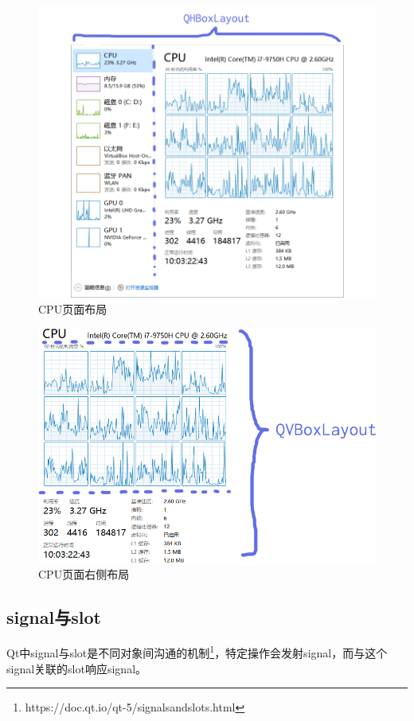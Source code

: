 \documentclass[UTF8,twoside,titlepage]{ctexart}
\begin{document}
\begin{figure}[htb]
    \centering
    \includegraphics[scale=0.34]{../media/layout/cpupage.png}
    \caption{CPU页面布局}
    \label{fig:cpupage}
\end{figure}

\begin{figure}[htb]
    \centering
    \includegraphics[scale=0.4]{../media/layout/cpupage right.png}
    \caption{CPU页面右侧布局}
    \label{fig:cpuright}
\end{figure}

\subsection{signal与slot}
Qt中signal与slot是不同对象间沟通的机制\footnote{https://doc.qt.io/qt-5/signalsandslots.html}，特定操作会发射signal，而与这个signal关联的slot响应signal。
\end{document}
